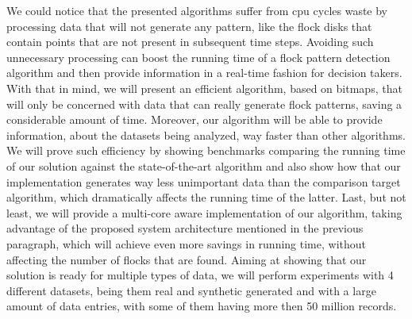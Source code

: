 We could notice that the presented algorithms suffer from \ac{cpu} cycles waste by processing data that will not
generate any pattern, like the flock disks that contain points that are not present in subsequent time steps. Avoiding
such unnecessary processing can boost the running time of a flock pattern detection algorithm and then provide
information in a real-time fashion for decision takers. With that in mind, we will present an efficient algorithm, based
on bitmaps, that will only be concerned with data that can really generate flock patterns, saving a considerable amount
of time. Moreover, our algorithm will be able to provide information, about the datasets being analyzed, way faster than
other algorithms. We will prove such efficiency by showing benchmarks comparing the running time of our solution against
the state-of-the-art algorithm and also show how that our implementation generates way less unimportant data than the
comparison target algorithm, which dramatically affects the running time of the latter. Last, but not least, we will
provide a multi-core aware implementation of our algorithm, taking advantage of the proposed system architecture
mentioned in the previous paragraph, which will achieve even more savings in running time, without affecting the number
of flocks that are found.  Aiming at showing that our solution is ready for multiple types of data, we will perform
experiments with 4 different datasets, being them real and synthetic generated and with a large amount of data entries,
with some of them having more then 50 million records.
